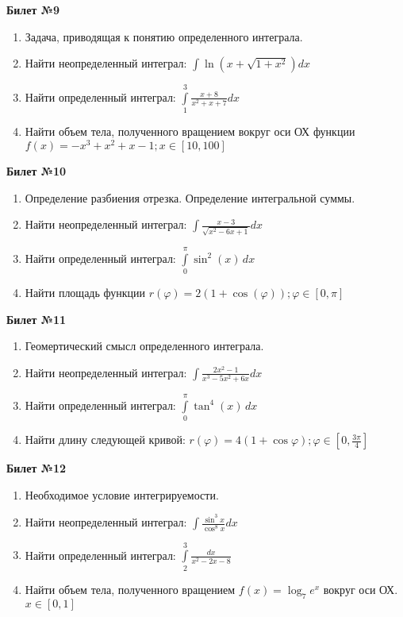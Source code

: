 \documentclass[a4paper, 12pt]{article}
\begin{document}
\begin{center}
	\textbf{Билет №9}
\end{center}
\begin{enumerate}
	\item Задача, приводящая к понятию определенного интеграла.
	\item Найти неопределенный интеграл: $\displaystyle \int{\ln (x + \sqrt{1 + x^2}) dx}$
	\item Найти определенный интеграл: $\displaystyle \int\limits_{1}^{3}{\frac{x+8}{x^2+x+7}dx}$
	\item Найти объем тела, полученного вращением вокруг оси ОХ функции $\displaystyle f(x) = - x ^ {3} + x^2 + x -1; x \in \left[10,100\right]$
\end{enumerate}

\begin{center}
	\textbf{Билет №10}
\end{center}
\begin{enumerate}
	\item Определение разбиения отрезка. Определение интегральной суммы.
	\item Найти неопределенный интеграл: $\displaystyle \int{\frac{x - 3}{\sqrt{x^2 - 6x + 1}} dx}$
	\item Найти определенный интеграл: $\displaystyle \int\limits_{0}^{\pi} \sin^2(x)\,dx$
	\item Найти площадь функции $\displaystyle r(\varphi) = 2(1+\cos(\varphi)); \varphi \in \left[0,\pi\right]$
\end{enumerate}
\newpage
\begin{center}
	\textbf{Билет №11}
\end{center}
\begin{enumerate}
	\item Геомертический смысл определенного интеграла.
	\item Найти неопределенный интеграл: $\displaystyle \int{\frac{2x^2 - 1}{x^3 - 5x^2 +6x} dx}$
	\item Найти определенный интеграл: $\displaystyle \int\limits_{0}^{\pi} \tan^4(x)\,dx$
	\item Найти длину следующей кривой: $\displaystyle r(\varphi) = 4(1+\cos{\varphi}); \varphi \in \left[0, \frac{3\pi}{4}\right]$
\end{enumerate}

\begin{center}
	\textbf{Билет №12}
\end{center}
\begin{enumerate}
	\item Необходимое условие интегрируемости.
	\item Найти неопределенный интеграл: $\displaystyle \int{\frac{\sin^3 x}{\cos^8 x} dx}$
	\item Найти определенный интеграл: $\displaystyle \int\limits_{2}^{3} \frac{dx}{x^2 - 2x - 8}$
	\item Найти объем тела, полученного вращением $\displaystyle f(x)=\log_{7}{e^x}$ вокруг оси ОХ. $x \in \left[0,1\right]$
\end{enumerate}
\end{document}

